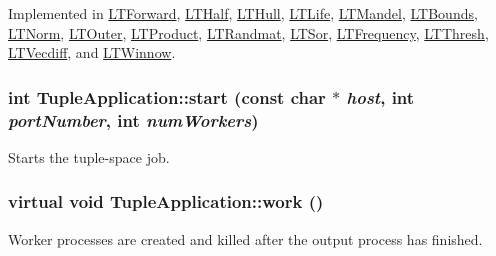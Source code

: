 Implemented in \hyperlink{class_l_t_forward_56c27cd419407319f95afa4e7d43409a}{LTForward}, \hyperlink{class_l_t_half_bf36d89af87f94ff2aaff36338717f37}{LTHalf}, \hyperlink{class_l_t_hull_14a3bf005173aa79d0c7259579229f12}{LTHull}, \hyperlink{class_l_t_life_a0ac21131813f89a94c6ba7515e63c11}{LTLife}, \hyperlink{class_l_t_mandel_31cacf747914e03e6a87bb9af7dff67e}{LTMandel}, \hyperlink{class_l_t_bounds_028a451c099ee3377dc64a5a8ae9954f}{LTBounds}, \hyperlink{class_l_t_norm_2e142e5c7fabd218436f2abe99f4535b}{LTNorm}, \hyperlink{class_l_t_outer_2a12a006761b2e1132b84209d29fddac}{LTOuter}, \hyperlink{class_l_t_product_d03b068863d7b2febcbb7b11ebb819ca}{LTProduct}, \hyperlink{class_l_t_randmat_3adc0a50f5840dcc1228f4449e2b5da3}{LTRandmat}, \hyperlink{class_l_t_sor_19e969a6ab342ee86d86721fbd37e7a6}{LTSor}, \hyperlink{class_l_t_frequency_e80cd869c8935cb7fe553c6ad27e861b}{LTFrequency}, \hyperlink{class_l_t_thresh_41ce024f24320a5bd65239e98ac85587}{LTThresh}, \hyperlink{class_l_t_vecdiff_69d3c6e3c51052522d474cc75d11a2f2}{LTVecdiff}, and \hyperlink{class_l_t_winnow_865de8a240ae781c8cc5567082edc2ea}{LTWinnow}.\hypertarget{class_tuple_application_9d0c51c481ef477787ffc2fd00116f4e}{
\subsubsection[{start}]{\setlength{\rightskip}{0pt plus 5cm}int TupleApplication::start (const char $\ast$ {\em host}, \/  int {\em portNumber}, \/  int {\em numWorkers})}}
\label{class_tuple_application_9d0c51c481ef477787ffc2fd00116f4e}


Starts the tuple-space job. \hypertarget{class_tuple_application_ef6ae8bb1d697e4ed038b43320183c89}{
\subsubsection[{work}]{\setlength{\rightskip}{0pt plus 5cm}virtual void TupleApplication::work ()}}
\label{class_tuple_application_ef6ae8bb1d697e4ed038b43320183c89}


Worker processes are created and killed after the output process has finished. 

